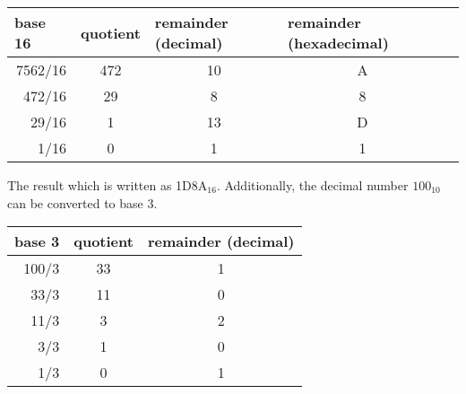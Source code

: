 \documentclass[11pt,twocolumn]{article}
\begin{document}
\begin{center}
\begin{tabular}{rcccl}
\multicolumn{1}{l}{\textbf{base 16}} & \multicolumn{1}{l}{\textbf{quotient}} & \multicolumn{1}{l}{\textbf{remainder (decimal)}} & \multicolumn{1}{l}{\textbf{remainder (hexadecimal)}} &  \\ \hline
7562/16                              & 472                                   & 10                                               & A                                            &  \\
472/16                               & 29                                    & 8                                                & 8                                            &  \\
29/16                                & 1                                     & 13                                               & D                                            &  \\
1/16                                 & 0                                     & 1                                                & 1                                            &
\end{tabular}
\end{center}

The result which is written as 1D8A$_{16}$. Additionally, the decimal
number $100_{10}$ can be converted to base 3.

\begin{center}
\begin{tabular}{rcc}
\multicolumn{1}{l}{\textbf{base 3}} & \multicolumn{1}{l}{\textbf{quotient}} & \multicolumn{1}{l}{\textbf{remainder (decimal)}} \\ \hline
100/3                               & 33                                    & 1                                                \\
33/3                                & 11                                    & 0                                                \\
11/3                                & 3                                     & 2                                                \\
3/3                                 & 1                                     & 0                                                \\
1/3                                 & 0                                     & 1
\end{tabular}
\end{center}
\end{document}
